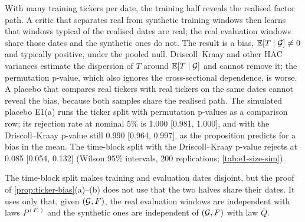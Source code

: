 With many training tickers per date, the training half reveals the realised factor path. A critic
that separates real from synthetic training windows then learns that windows typical of the
realised dates are real; the real evaluation windows share those dates and the synthetic ones do
not. The result is a bias, $\mathbb{E}[T\mid\mathcal{G}]\neq0$ and typically positive, under the pooled null.
Driscoll--Kraay and other HAC variances estimate the dispersion of $T$ around $\mathbb{E}[T\mid\mathcal{G}]$ and
cannot remove it; the permutation p-value, which also ignores the cross-sectional dependence, is
worse. A placebo that compares real tickers with real tickers on the same dates cannot reveal the
bias, because both samples share the realised path. The simulated placebo E1(a) runs the ticker
split with permutation p-values as a comparison row; its rejection rate at nominal 5\% is 1.000
[0.981, 1.000], and with the Driscoll--Kraay p-value still 0.990 [0.964, 0.997], as the proposition
predicts for a bias in the mean. The time-block split with the Driscoll--Kraay p-value rejects at
0.085 [0.054, 0.132] (Wilson 95\% intervals, 200 replications; \cref{tab:e1-size-sim}).

The time-block split makes training and evaluation dates disjoint, but the proof of
\cref{prop:ticker-bias}(a)--(b) does not use that the two halves share their dates. It uses only
that, given $(\mathcal{G},F)$, the real evaluation windows are independent with laws $P^{(F_\tau)}$ and
the synthetic ones are independent of $(\mathcal{G},F)$ with law $\bar Q$.


